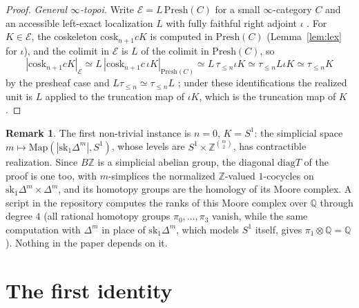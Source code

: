\documentclass[11pt]{amsart}
\theoremstyle{definition}
\newtheorem{rem}[thm]{Remark}
\newcommand{\Presh}{\mathrm{Presh}}
\newcommand{\Map}{\mathrm{Map}}
\newcommand{\cosk}{\mathrm{cosk}}
\newcommand{\sk}{\mathrm{sk}}
\newcommand{\E}{\mathcal E}
\newcommand{\tr}[1]{\tau_{\le #1}}
\newcommand{\diag}{\mathrm{diag}}
\begin{document}
\begin{proof}
\emph{General $\infty$-topoi.} Write $\E=L\,\Presh(C)$ for a small
$\infty$-category $C$ and an accessible left-exact localization $L$ with
fully faithful right adjoint $\iota$ \cite[6.1.0.6]{HTT}. For $K\in\E$, the
coskeleton $\cosk_{n+1}cK$ is computed in $\Presh(C)$ (Lemma~\ref{lem:lex}
for $\iota$), and the colimit in $\E$ is $L$ of the colimit in $\Presh(C)$, so
\[
|\cosk_{n+1}cK|_{\E}\simeq L\,|\cosk_{n+1}c\,\iota K|_{\Presh(C)}
\simeq L\,\tr n\iota K\simeq\tr nL\iota K\simeq\tr nK
\]
by the presheaf case and $L\tr n\simeq\tr nL$ \cite[5.5.6.28]{HTT}; under
these identifications the realized unit is $L$ applied to the truncation map
of $\iota K$, which is the truncation map of $K$.
\end{proof}

\begin{rem}\label{rem:check}
The first non-trivial instance is $n=0$, $K=S^1$: the simplicial space
$m\mapsto\Map(|\sk_1\Delta^m|,S^1)$, whose levels are
$S^1\times\mathbb Z^{\binom m2}$, has contractible realization. Since
$B\mathbb Z$ is a simplicial abelian group, the diagonal
$\diag T$ of the proof is one too, with $m$-simplices the normalized
$\mathbb Z$-valued $1$-cocycles on $\sk_1\Delta^m\times\Delta^m$, and its
homotopy groups are the homology of its Moore complex. A script in the
repository computes the ranks of this Moore complex over $\mathbb Q$ through
degree $4$ (all rational homotopy groups $\pi_0,\dots,\pi_3$ vanish, while the
same computation with $\Delta^m$ in place of $\sk_1\Delta^m$, which models
$S^1$ itself, gives $\pi_1\otimes\mathbb Q=\mathbb Q$). Nothing in the paper
depends on it.
\end{rem}

\section{The first identity}\label{sec:join}
\end{document}
